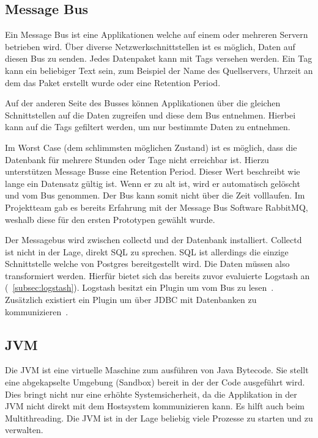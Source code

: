 \subsection{Message Bus}
Ein Message Bus ist eine Applikationen welche auf einem oder mehreren Servern
betrieben wird. Über diverse Netzwerkschnittstellen ist es möglich, Daten auf
diesen Bus zu senden. Jedes Datenpaket kann mit Tags versehen werden. Ein Tag
kann ein beliebiger Text sein, zum Beispiel der Name des Quellservers, Uhrzeit
an dem das Paket erstellt wurde oder eine Retention Period.

Auf der anderen Seite des Busses können Applikationen über die gleichen
Schnittstellen auf die Daten zugreifen und diese dem Bus entnehmen. Hierbei
kann auf die Tags gefiltert werden, um nur bestimmte Daten zu entnehmen.

Im Worst Case (dem schlimmsten möglichen Zustand) ist es möglich, dass die
Datenbank für mehrere Stunden oder Tage nicht erreichbar ist. Hierzu
unterstützen Message Busse eine Retention Period. Dieser Wert beschreibt wie
lange ein Datensatz gültig ist. Wenn er zu alt ist, wird er automatisch
gelöscht und vom Bus genommen. Der Bus kann somit nicht über die Zeit
volllaufen. Im Projektteam gab es bereits Erfahrung mit der Message Bus
Software RabbitMQ, weshalb diese für den ersten Prototypen gewählt wurde.

Der Messagebus wird zwischen collectd und der Datenbank installiert. Collectd
ist nicht in der Lage, direkt SQL zu sprechen. SQL ist allerdings die einzige
Schnittstelle welche von Postgres bereitgestellt wird. Die Daten müssen also
transformiert werden. Hierfür bietet sich das bereits zuvor evaluierte Logstash
an (~\ref{subsec:logstash}). Logstash besitzt ein Plugin um vom Bus zu
lesen~\cite{logstash-rabbitmq}. Zusätzlich existiert ein Plugin um über JDBC
mit Datenbanken zu kommunizieren~\cite{logstash-jdbc}.
\tm%

\subsection{JVM}
Die \gls{JVM} ist eine virtuelle Maschine zum ausführen von Java Bytecode. Sie
stellt eine abgekapselte Umgebung (Sandbox) bereit in der der Code ausgeführt
wird. Dies bringt nicht nur eine erhöhte Systemsicherheit, da die Applikation
in der JVM nicht direkt mit dem Hostsystem kommunizieren kann. Es hilft auch
beim Multithreading. Die JVM ist in der Lage beliebig viele Prozesse zu starten
und zu verwalten.

